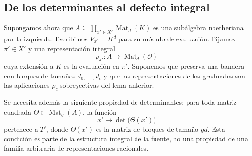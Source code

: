 \subsection{De los determinantes al defecto integral}

Supongamos ahora que $A\subseteq\prod_{x'\in X'}\operatorname{Mat}_d(K)$ es una subálgebra noetheriana por la izquierda. Escribimos $V_{x'}=K^d$ para su módulo de evaluación. Fijamos $\pi'\in X'$ y una representación integral
\[
 \rho_{\pi'}:A\longrightarrow\operatorname{Mat}_d(\mathcal O)
\]
cuya extensión a $K$ es la evaluación en $\pi'$. Suponemos que preserva una bandera con bloques de tamaños $d_0,\ldots,d_t$ y que las representaciones de los graduados son las aplicaciones $\rho_c$ sobreyectivas del lema anterior.

Se necesita además la siguiente propiedad de determinantes: para toda matriz cuadrada $\Theta\in\operatorname{Mat}_g(A)$, la función
\[
 x'\longmapsto\det\bigl(\Theta(x')\bigr)
\]
pertenece a $T'$, donde $\Theta(x')$ es la matriz de bloques de tamaño $gd$. Esta condición es parte de la estructura integral de la fuente, no una propiedad de una familia arbitraria de representaciones racionales.


